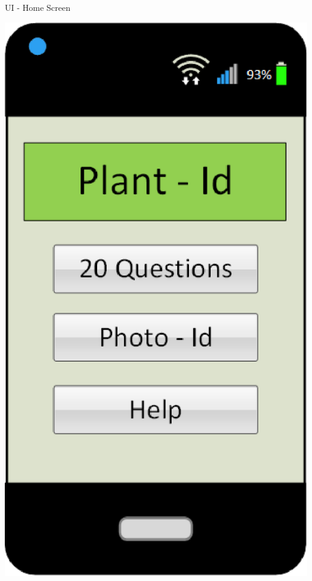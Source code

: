 \documentclass{beamer}
\begin{document}
\begin{frame}{UI - Home Screen}
\begin{center}\includegraphics[scale=.5]{HomeScreen.eps}\end{center}
\end{frame}
\end{document}
